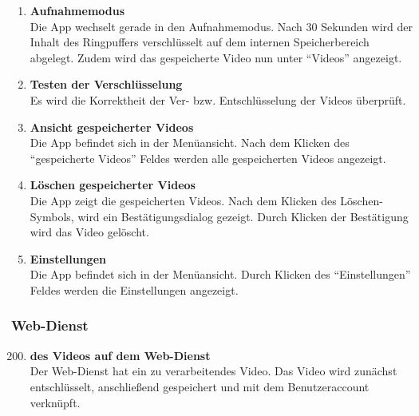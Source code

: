\begin{enumerate}[\bfseries{TK}10]
\item \textbf{Aufnahmemodus} \hfill\\  
Die \gls{App} wechselt gerade in den Aufnahmemodus. Nach 30 Sekunden wird der Inhalt des Ringpuffers verschl\"usselt auf dem internen Speicherbereich abgelegt. Zudem wird das gespeicherte Video nun unter ``Videos'' angezeigt. 

\item \textbf{Testen der Verschl\"usselung} \hfill\\
Es wird die Korrektheit der Ver- bzw. Entschlüsselung der Videos überprüft.

\item \textbf{Ansicht gespeicherter Videos} \hfill\\
Die \gls{App} befindet sich in der Men\"uansicht. Nach dem Klicken des ``gespeicherte Videos'' Feldes werden alle gespeicherten Videos angezeigt.

\item \textbf{Löschen gespeicherter Videos} \hfill\\
Die \gls{App} zeigt die gespeicherten Videos. Nach dem Klicken des Löschen-Symbols, wird ein Bestätigungsdialog  gezeigt. Durch Klicken der Bestätigung wird das Video gelöscht.

\item \textbf{Einstellungen} \hfill\\
Die \gls{App} befindet sich in der Men\"uansicht. Durch Klicken des ``Einstellungen'' Feldes werden die Einstellungen angezeigt.

\end{enumerate}

\subsubsection{\gls{Web-Dienst}}
\begin{enumerate}[\bfseries{TK}10]  
\setcounter{enumi}{199}{}
\item \textbf{ des Videos auf dem \gls{Web-Dienst}} \hfill\\  
Der Web-Dienst hat ein zu verarbeitendes Video. Das Video wird zunächst entschlüsselt,  anschließend gespeichert und mit dem Benutzeraccount verkn\"upft.

\end{enumerate}

